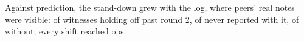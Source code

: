 Against prediction, the stand-down grew with the log, where peers' real notes were visible: of witnesses holding off past round 2, \wtthHaikuHeldOffNoReceiptNeverK{} of \wtthHaikuHeldOffNoReceiptN{} never reported with it, \wtthHaikuHeldOffClaimNeverK{} of \wtthHaikuHeldOffClaimN{} without; every shift reached ops.
